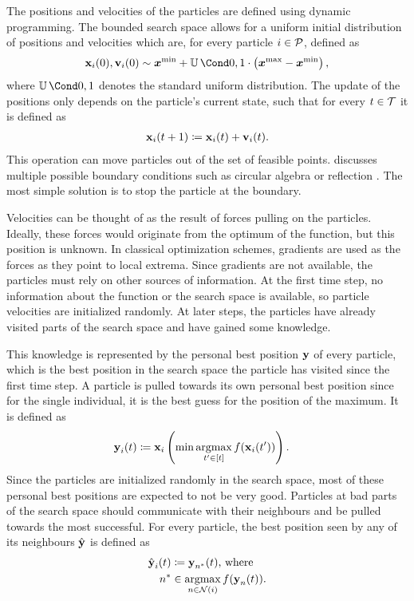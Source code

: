 The positions and velocities of the particles are defined using dynamic programming.
The bounded search space allows for a uniform initial distribution of positions and velocities which are, for every particle $i \in \operatorname{\mathcal{P}}$, defined as
\begin{align}
    \Pos_i(0), \Vel_i(0) \sim \mat{x^{\text{min}}} + \Uniform{0, 1} \cdot \left( \mat{x^{\text{max}}} - \mat{x^{\text{min}}} \right),
\end{align}
where $\Uniform{0, 1}$ denotes the standard uniform distribution.
The update of the positions only depends on the particle's current state, such that for every $t \in \mathcal{T}$ it is defined as
\begin{align}
    \operatorname{\mathbf{x}}_i(t+1) \coloneqq \operatorname{\mathbf{x}}_i(t) + \operatorname{\mathbf{v}}_i(t).
\end{align}
This operation can move particles out of the set of feasible points.
\citeauthor{engelbrecht_fundamentals_2006} discusses multiple possible boundary conditions such as circular algebra or reflection \cite{engelbrecht_fundamentals_2006}.
The most simple solution is to stop the particle at the boundary.

Velocities can be thought of as the result of forces pulling on the particles.
Ideally, these forces would originate from the optimum of the function, but this position is unknown.
In classical optimization schemes, gradients are used as the forces as they point to local extrema.
Since gradients are not available, the particles must rely on other sources of information.
At the first time step, no information about the function or the search space is available, so particle velocities are initialized randomly.
At later steps, the particles have already visited parts of the search space and have gained some knowledge.

This knowledge is represented by the personal best position $\operatorname{\mathbf{y}}$ of every particle, which is the best position in the search space the particle has visited since the first time step.
A particle is pulled towards its own personal best position since for the single individual, it is the best guess for the position of the maximum.
It is defined as
\begin{align}
    \operatorname{\mathbf{y}}_i(t) &\coloneqq \operatorname{\mathbf{x}}_i \left(\min\operatorname*{argmax}_{t^\prime \in [t]} f(\operatorname{\mathbf{x}}_i(t^\prime)) \right).
\end{align}
Since the particles are initialized randomly in the search space, most of these personal best positions are expected to not be very good.
Particles at bad parts of the search space should communicate with their neighbours and be pulled towards the most successful.
For every particle, the best position seen by any of its neighbours $\operatorname{\hat{\operatorname{\mathbf{y}}}}$ is defined as
\begin{align}
    \begin{split}
        \operatorname{\hat{\operatorname{\mathbf{y}}}}_i(t) &\coloneqq \operatorname{\mathbf{y}}_{n^\ast}(t) \text{, where} \\
        n^\ast &\in \operatorname*{argmax}_{n \in \operatorname{\mathcal{N}}(i)} f(\operatorname{\mathbf{y}}_n(t)).
    \end{split}
\end{align}

